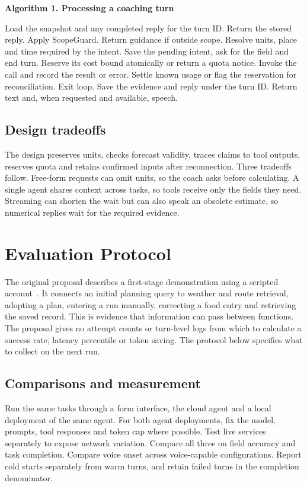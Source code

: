 \documentclass[conference]{IEEEtran}
\begin{document}
\par\smallskip\noindent\textbf{Algorithm 1. Processing a coaching turn}\par
\begin{algorithmic}[1]
\STATE Load the snapshot and any completed reply for the turn ID.
  \STATE Return the stored reply.
\ENDIF
\STATE Apply ScopeGuard. Return guidance if outside scope.
\STATE Resolve units, place and time required by the intent.
  \STATE Save the pending intent, ask for the field and end turn.
\ENDIF
{}
  \STATE Reserve its cost bound atomically or return a quota notice.
  \STATE Invoke the call and record the result or error.
  \STATE Settle known usage or flag the reservation for reconciliation.
    \STATE Exit loop.
  \ENDIF
\ENDFOR
\STATE Save the evidence and reply under the turn ID.
\STATE Return text and, when requested and available, speech.
\end{algorithmic}

\subsection{Design tradeoffs}
The design preserves units, checks forecast validity, traces claims to tool outputs, reserves quota and retains confirmed inputs after reconnection. Three tradeoffs follow. Free-form requests can omit units, so the coach asks before calculating. A single agent shares context across tasks, so tools receive only the fields they need. Streaming can shorten the wait but can also speak an obsolete estimate, so numerical replies wait for the required evidence.

\section{Evaluation Protocol}
The original proposal describes a first-stage demonstration using a scripted account~\cite{proposal,project}. It connects an initial planning query to weather and route retrieval, adopting a plan, entering a run manually, correcting a food entry and retrieving the saved record. This is evidence that information can pass between functions. The proposal gives no attempt counts or turn-level logs from which to calculate a success rate, latency percentile or token saving. The protocol below specifies what to collect on the next run.
\subsection{Comparisons and measurement}
Run the same tasks through a form interface, the cloud agent and a local deployment of the same agent. For both agent deployments, fix the model, prompts, tool responses and token cap where possible. Test live services separately to expose network variation. Compare all three on field accuracy and task completion. Compare voice onset across voice-capable configurations. Report cold starts separately from warm turns, and retain failed turns in the completion denominator.
\end{document}
